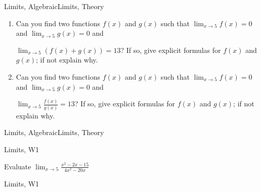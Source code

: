 \begin{tagblock}{Limits, AlgebraicLimits, Theory}
\begin{question}
	 \begin{enumerate}

\item Can you find two functions $f(x)$ and $g(x)$ such that $\displaystyle \lim_{x \to 5} f(x) = 0$ and $\displaystyle \lim_{x \to 5} g(x) = 0$ and 


$\displaystyle \lim_{x \to 5} ({f(x)} + {g(x)})  = 13$?  If so, give explicit formulas for $f(x)$ and $g(x)$; if not explain why. 


\vspace{3in}

\item Can you find two functions $f(x)$ and $g(x)$ such that $\displaystyle \lim_{x \to 5} f(x) = 0$ and $\displaystyle \lim_{x \to 5} g(x) = 0$ and 


$\displaystyle \lim_{x \to 5} \frac{f(x)}{g(x)}  = 13$?  If so, give explicit formulas for $f(x)$ and $g(x)$; if not explain why.  

\end{enumerate}
	
	
\begin{tags}
	    Limits, AlgebraicLimits, Theory
\end{tags}
	
\begin{diary}
	    
\end{diary}
	
\begin{solution}
	  
\end{solution}
	
\end{question}

\end{tagblock}


\begin{tagblock}{Limits, W1}
\begin{question}
	Evaluate $\displaystyle\lim_{x\to 5}\frac{x^2-2x-15}{4x^2-20x}$
	
	
\begin{tags}
	    Limits, W1
\end{tags}
	
\begin{diary}
	    
\end{diary}
	
\begin{solution}
	  
\end{solution}
	
\end{question}

\end{tagblock}

